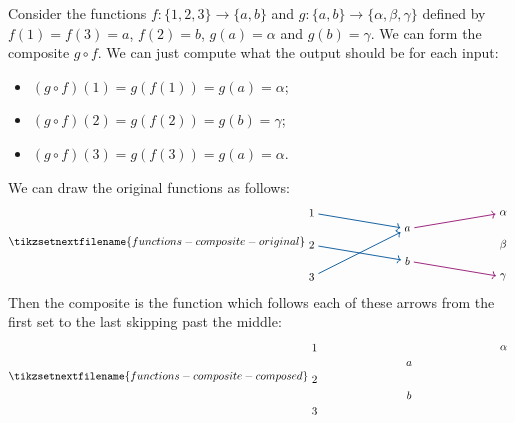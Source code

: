 \documentclass[fleqn]{LectureClass/LectureClass}
\begin{document}
    \begin{exm}{}{}
        Consider the functions \(f \colon \{1, 2, 3\} \to \{a, b\}\) and \(g \colon \{a, b\} \to \{\alpha, \beta, \gamma\}\) defined by \(f(1) = f(3) = a\), \(f(2) = b\), \(g(a) = \alpha\) and \(g(b) = \gamma\).
        We can form the composite \(g \circ f\).
        We can just compute what the output should be for each input:
        \begin{itemize}
            \item \((g \circ f)(1) = g(f(1)) = g(a) = \alpha\);
            \item \((g \circ f)(2) = g(f(2)) = g(b) = \gamma\);
            \item \((g \circ f)(3) = g(f(3)) = g(a) = \alpha\).
        \end{itemize}
        We can draw the original functions as follows:
        \begin{equation}
            \tikzsetnextfilename{functions-composite-original}
            \begin{tikzpicture}[baseline=(current bounding box)]
                \node (n1) at (0, 2) {\(1\)};
                \node (n2) at (0, 1) {\(2\)};
                \node (n3) at (0, 0) {\(3\)};
                \node (a) at (3, 1.5) {\(a\)};
                \node (b) at (3, 0.5) {\(b\)};
                \node (alpha) at (6, 2) {\(\alpha\)};
                \node (beta) at (6, 1) {\(\beta\)};
                \node (gamma) at (6, 0) {\(\gamma\)};
                \draw [thick, glasgowSkyblue, ->] (n1) -- (a);
                \draw [thick, glasgowSkyblue, ->] (n2) -- (b);
                \draw [thick, glasgowSkyblue, ->] (n3) -- (a);
                \draw [thick, glasgowThistle, ->] (a) -- (alpha);
                \draw [thick, glasgowThistle, ->] (b) -- (gamma);
            \end{tikzpicture}
        \end{equation}
        Then the composite is the function which follows each of these arrows from the first set to the last skipping past the middle:
        \begin{equation}
            \tikzsetnextfilename{functions-composite-composed}
            \begin{tikzpicture}[baseline=(current bounding box)]
                \node (n1) at (0, 2) {\(1\)};
                \node (n2) at (0, 1) {\(2\)};
                \node (n3) at (0, 0) {\(3\)};
                \node (a) at (3, 1.5) {\(a\)};
                \node (b) at (3, 0.5) {\(b\)};
                \node (alpha) at (6, 2) {\(\alpha\)};

\end{tikzpicture}
\end{equation}
\end{exm}
\end{document}
